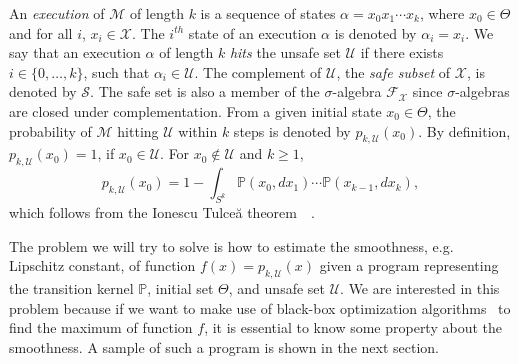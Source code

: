 \documentclass[11pt]{report}
\newcommand{\M}{\mathcal{M}}
\newcommand{\X}{\mathcal{X}}
\newcommand{\F}{\mathcal{F}}
\newcommand{\phit}[3]{{p_{#1,#2}{(#3)}}}
\newcommand{\Unsafe}{\mathcal{U}}
\begin{document}
An {\em execution} of $\M$  of length $k$ is a sequence of states $\alpha = x_0 x_1 \cdots x_k$, where $x_0 \in \Theta$ and for all $i$, $x_i \in \X$. The $i^{\mathit{th}}$ state of an execution $\alpha$ is denoted by $\alpha_i = x_i$.
%
We say that an execution $\alpha$ of length $k$ \emph{hits} the unsafe set $\Unsafe$ if there exists $i\in\{0,\ldots,k\}$, such that  $\alpha_i \in \Unsafe$.
The complement of $\Unsafe$, the  {\em safe subset} of $\X$, is denoted by $\mathcal{S}$. The safe set is also a member of the $\sigma$-algebra $\F_\X$ since $\sigma$-algebras are closed under complementation. From a given initial state $x_0 \in \Theta$, the probability of $\M$ hitting $\Unsafe$ within $k$ steps is denoted by $\phit{k}{\Unsafe}{x_0}$. By definition, $\phit{k}{\Unsafe}{x_0} = 1$, if $x_0 \in \Unsafe$. For $x_0 \notin \Unsafe$ and $k \geq 1$,   
\begin{equation}
\label{eq:prob_int}
\phit{k}{\Unsafe}{x_0} = 1 - \int_{S^k} \mathbb{P}(x_0, dx_1) \cdots \mathbb{P}(x_{k-1}, dx_k),
\end{equation}
which follows from the Ionescu Tulce{\u a} theorem~\cite{ionescu1949mesures}~\cite{petritis2012}.

The problem we will try to solve is how to estimate the smoothness, e.g. Lipschitz constant, of function $f(x) = \phit{k}{\Unsafe}{x}$ given a program representing the transition kernel $\mathbb{P}$, initial set $\Theta$, and unsafe set $\Unsafe$. We are interested in this problem because if we want to make use of black-box optimization algorithms~\cite{bubeck2009online} to find the maximum of function $f$, it is essential to know some property about the smoothness. A sample of such a program is shown in the next section.
\end{document}
